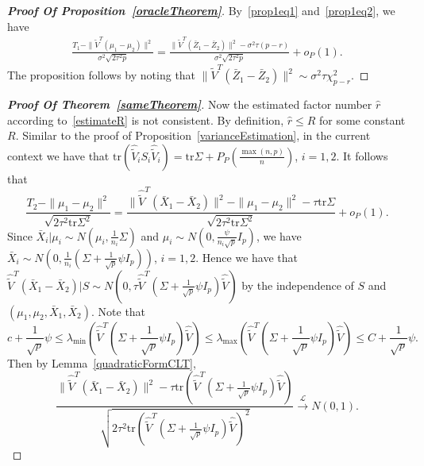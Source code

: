 \documentclass[review]{elsarticle}
\theoremstyle{plain}
\theoremstyle{definition}
\theoremstyle{remark}
\begin{document}
\begin{proof}[\textbf{Proof Of Proposition~\ref{oracleTheorem}}]
    By~\eqref{prop1eq1} and~\eqref{prop1eq2}, we have
    \begin{equation}
        \begin{aligned}
            \frac{T_1-\|\tilde{V}^T(\mu_1-\mu_2)\|^2}{\sigma^2\sqrt{2\tau^2 p}}
            =
            \frac{\|\tilde{V}^T(\bar{Z}_1-\bar{Z}_2)\|^2-
                \sigma^2 \tau (p-r)}{\sigma^2\sqrt{2\tau^2 p}}
                +o_P(1).
        \end{aligned}
    \end{equation}
The proposition follows by noting that
$\|\tilde{V}^T(\bar{Z}_1-\bar{Z}_2)\|^2\sim \sigma^2\tau\chi^2_{p-r}$.
\end{proof}




\begin{proof}[\textbf{Proof Of Theorem~\ref{sameTheorem}}]
    Now the estimated factor number $\hat{r}$ according to~\eqref{estimateR} is not consistent.
    By definition, $\hat{r}\leq R$ for some constant $R$.
    Similar to the proof of Proposition~\ref{varianceEstimation}, in the current context we have that
    $\mathrm{tr}(\hat{\tilde{V}}_i S_i \hat{\tilde{V}}_i)=\mathrm{tr}\Sigma+P_P(\frac{\max(n,p)}{n})$, $i=1,2$. It follows that
    $$
    \frac{T_2-\|\mu_1-\mu_2\|^2}{\sqrt{2\tau^2 \mathrm{tr}\Sigma^2}}
    =
    \frac{\|\hat{\tilde{V}}^T(\bar{X}_1-\bar{X}_2)\|^2-\|\mu_1-\mu_2\|^2-\tau \mathrm{tr}\Sigma}{\sqrt{2\tau^2 \mathrm{tr}\Sigma^2}}+o_P(1).
    $$
 Since $\bar{X}_i|\mu_i\sim N(\mu_i,\frac{1}{n_i}\Sigma)$ and
    $\mu_i\sim N(0,\frac{\psi}{n_i\sqrt{p}}I_p)$,
we have $\bar{X}_i\sim N(0,\frac{1}{n_i}(\Sigma+\frac{1}{\sqrt{p}}\psi I_p))$, $i=1,2$.
    Hence we have that $\hat{\tilde{V}}^T(\bar{X}_1-\bar{X}_2)|S\sim N(0,\tau\hat{\tilde{V}}^T(\Sigma+\frac{1}{\sqrt{p}}\psi I_p)\hat{\tilde{V}})$ by the independence of $S$ and $(\mu_1,\mu_2,\bar{X}_1,\bar{X}_2)$.
    Note that 
    $$
    c+\frac{1}{\sqrt{p}}\psi
    \leq
    \lambda_{\min}(\hat{\tilde{V}}^T(\Sigma+\frac{1}{\sqrt{p}}\psi I_p)\hat{\tilde{V}})
    \leq
    \lambda_{\max}(\hat{\tilde{V}}^T(\Sigma+\frac{1}{\sqrt{p}}\psi I_p)\hat{\tilde{V}})
    \leq C+\frac{1}{\sqrt{p}}\psi.
    $$
    Then by Lemma~\ref{quadraticFormCLT},
    \begin{equation}\label{sameTheorem:5}
    \frac{\|\hat{\tilde{V}}^T(\bar{X}_1-\bar{X}_2)\|^2-\tau\mathrm{tr}(\hat{\tilde{V}}^T(\Sigma+\frac{1}{\sqrt{p}}\psi I_p)\hat{\tilde{V}})}{\sqrt{2\tau^2\mathrm{tr}(\hat{\tilde{V}}^T(\Sigma+\frac{1}{\sqrt{p}}\psi I_p)\hat{\tilde{V}})^2}}\xrightarrow{\mathcal{L}}N(0,1).

\end{equation}
\end{proof}
\end{document}

